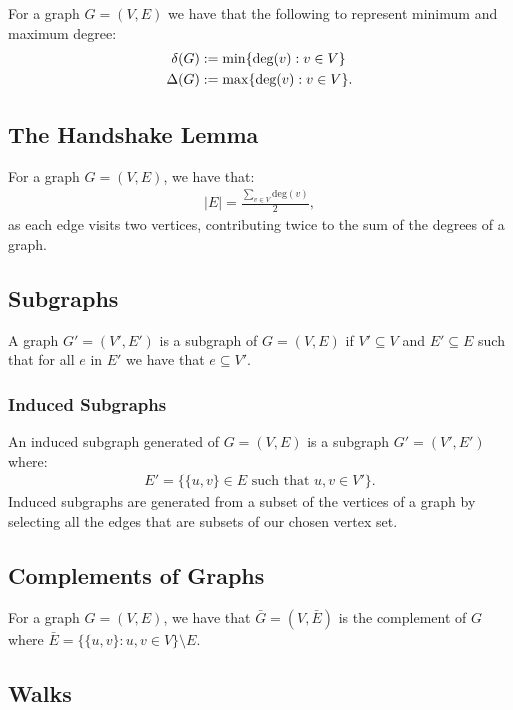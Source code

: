 For a graph $G = (V, E)$ we have that the following to represent
minimum and maximum degree: \begin{align*}
  \delta(G) &:= \operatorname{min}\{\text{deg}(v) : v \in V\} \\
  \Delta(G) &:= \operatorname{max}\{\text{deg}(v) : v \in V\}.
\end{align*}

\subsection{The Handshake Lemma}

For a graph $G = (V, E)$, we have that: \begin{gather*}
  |E| = \frac{\sum_{v \in V} \text{deg}(v)}{2},
\end{gather*} as each edge visits two vertices, contributing
twice to the sum of the degrees of a graph.

\subsection{Subgraphs}

A graph $G' = (V', E')$ is a subgraph of $G = (V, E)$ if
$V' \subseteq V$ and $E' \subseteq E$ such that for all $e$
in $E'$ we have that $e \subseteq V'$.

\subsubsection{Induced Subgraphs}

An induced subgraph generated of $G = (V, E)$
is a subgraph $G' = (V', E')$ where: \begin{gather*} 
  E' = \{\{u, v\} \in E \text{ such that } u, v \in V'\}.
\end{gather*} Induced subgraphs are generated from a subset of 
the vertices of a graph by selecting all the edges that
are subsets of our chosen vertex set.

\subsection{Complements of Graphs}

For a graph $G = (V, E)$, we have that $\bar{G} = (V, \bar{E})$ is
the complement of $G$ where $\bar{E} = \{\{u, v\} : u, v \in V\} \setminus E$.

\subsection{Walks}

